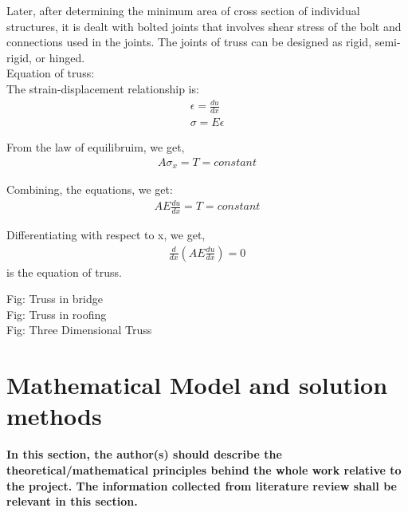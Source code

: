Later, after determining the minimum area of cross section of individual structures, it is dealt with bolted joints that involves shear stress of the bolt and connections used in the joints. The joints of truss can be designed as rigid, semi-rigid, or hinged.\\

Equation of truss: \\

The strain-displacement relationship is: \\
\begin{eqnarray}
	\epsilon = \frac{du}{dx}\\
	\sigma = E\epsilon
\end{eqnarray}

From the law of equilibruim, we get,
\begin{eqnarray}
	A\sigma_x = T = constant
\end{eqnarray}

Combining, the equations, we get:
\begin{eqnarray}
	AE\frac{du}{dx} = T = constant
\end{eqnarray}

Differentiating with respect to x, we get,
\begin{eqnarray}
	\frac{d}{dx}(AE\frac{du}{dx}) = 0
\end{eqnarray}
is the equation of truss.

Fig:  Truss in bridge\\

Fig:  Truss in roofing\\

Fig: Three Dimensional Truss\\




\section{\bf{Mathematical Model and solution methods}}
{\bf\color{red}In this section, the author(s) should describe the theoretical/mathematical principles behind the whole work relative to the project. The information collected from literature review shall be relevant in this section.
}

